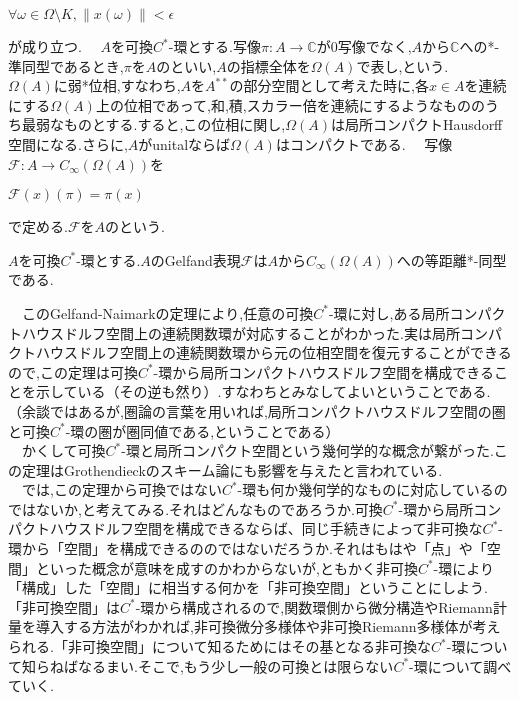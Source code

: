 \begin{center}
$\forall \omega \in \Omega\setminus K,\parallel x\left( \omega\right)\parallel<\epsilon$
\end{center}
が成り立つ.
　$A$を可換$C^*$-環とする.写像$\pi:A\rightarrow\mathbb{C}$が0写像でなく,$A$から$\mathbb{C}$への*-準同型であるとき,$\pi$を$A$のといい,$A$の指標全体を$\Omega\left(A\right)$で表し,という.
　$\Omega\left(A\right)$に弱*位相,すなわち,$A$を$A^{**}$の部分空間として考えた時に,各$x\in A$を連続にする$\Omega\left(A\right)$上の位相であって,和,積,スカラー倍を連続にするようなもののうち最弱なものとする.すると,この位相に関し,$\Omega\left(A\right)$は局所コンパクトHausdorff空間になる.さらに,$A$がunitalならば$\Omega\left(A\right)$はコンパクトである.
　写像$\mathscr{F}:A \rightarrow C_{\infty}\left(\Omega\left(A\right)\right)$を
\begin{center}
$\mathscr{F}\left(x\right)\left(\pi\right)=\pi\left(x\right)$
\end{center}
で定める.$\mathscr{F}$を$A$のという.
\begin{theo}
$A$を可換$C^*$-環とする.$A$の{\rm Gelfand}表現$\mathscr{F}$は$A$から$C_{\infty}\left(\Omega\left(A\right)\right)$への等距離*-同型である.
\end{theo}
　このGelfand-Naimarkの定理により,任意の可換$C^*$-環に対し,ある局所コンパクトハウスドルフ空間上の連続関数環が対応することがわかった.実は局所コンパクトハウスドルフ空間上の連続関数環から元の位相空間を復元することができるので,この定理は可換$C^*$-環から局所コンパクトハウスドルフ空間を構成できることを示している（その逆も然り）.すなわちとみなしてよいということである.（余談ではあるが,圏論の言葉を用いれば,局所コンパクトハウスドルフ空間の圏と可換$C^*$-環の圏が圏同値である,ということである）\\
　かくして可換$C^*$-環と局所コンパクト空間という幾何学的な概念が繋がった.この定理はGrothendieckのスキーム論にも影響を与えたと言われている.\\
　では,この定理から可換ではない$C^*$-環も何か幾何学的なものに対応しているのではないか,と考えてみる.それはどんなものであろうか.可換$C^*$-環から局所コンパクトハウスドルフ空間を構成できるならば、同じ手続きによって非可換な$C^*$-環から「空間」を構成できるののではないだろうか.それはもはや「点」や「空間」といった概念が意味を成すのかわからないが,ともかく非可換$C^*$-環により「構成」した「空間」に相当する何かを「非可換空間」ということにしよう.「非可換空間」は$C^*$-環から構成されるので,関数環側から微分構造やRiemann計量を導入する方法がわかれば,非可換微分多様体や非可換Riemann多様体が考えられる.「非可換空間」について知るためにはその基となる非可換な$C^*$-環について知らねばなるまい.そこで,もう少し一般の可換とは限らない$C^*$-環について調べていく.
